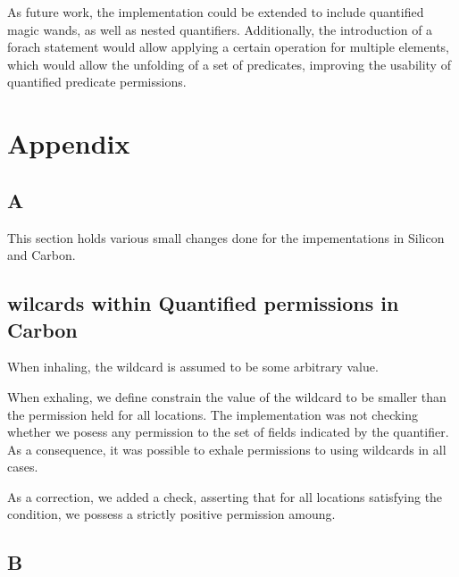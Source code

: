 \documentclass[12pt]{article}
\begin{document}
As future work, the implementation could be extended to include quantified magic wands, as well as nested quantifiers. Additionally, the introduction of a forach statement would allow applying a certain operation for multiple elements, which would allow the unfolding of a set of predicates, improving the usability of quantified predicate permissions.



\newpage
\section{Appendix}
\subsection{A}
This section holds various small changes done for the impementations in Silicon and Carbon.

\subsection{wilcards within Quantified permissions in Carbon}
When inhaling, the wildcard is assumed to be some arbitrary value. 

When exhaling, we define constrain the value of the wildcard to be smaller than the permission held for all locations. The implementation was not checking whether we posess any permission to the set of fields indicated by the quantifier. As a consequence, it was possible to exhale permissions to using wildcards in all cases.

As a correction, we added a check, asserting that for all locations satisfying the condition, we possess a strictly positive permission amoung.

\subsection{B}

\end{document}
